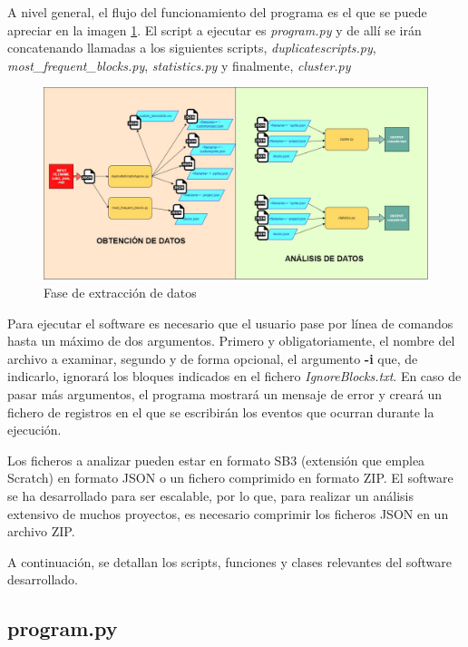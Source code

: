 \documentclass[a4paper, 12pt]{book}
\begin{document}

A nivel general, el flujo del funcionamiento del programa es el que se puede apreciar en la imagen \ref{fig:fasedesejecucion}. El script a ejecutar es \textit{program.py} y de allí se irán concatenando llamadas a los siguientes scripts, \textit{duplicatescripts.py}, \textit{most\_frequent\_blocks.py}, \textit{statistics.py} y finalmente, \textit{cluster.py}

\begin{figure}
  \centering
  \includegraphics[width=15cm, keepaspectratio]{img/flow.jpg}
  \caption{Fase de extracción de datos}
  \label{fig:fasedesejecucion}
\end{figure}

Para ejecutar el software es necesario que el usuario pase por línea de comandos hasta un máximo de dos argumentos. Primero y obligatoriamente, el nombre del archivo a examinar, segundo y de forma opcional, el argumento \textbf{-i} que, de indicarlo, ignorará los bloques indicados en el fichero \textit{IgnoreBlocks.txt}. En caso de pasar más argumentos, el programa mostrará un mensaje de error y creará un fichero de registros en el que se escribirán los eventos que ocurran durante la ejecución.

Los ficheros a analizar pueden estar en formato SB3 (extensión que emplea Scratch) en formato JSON o un fichero comprimido en formato ZIP. El software se ha desarrollado para ser escalable, por lo que, para realizar un análisis extensivo de muchos proyectos, es necesario comprimir los ficheros JSON en un archivo ZIP. 

A continuación, se detallan los scripts, funciones y clases relevantes del software desarrollado.

\subsection{program.py}
\end{document}
